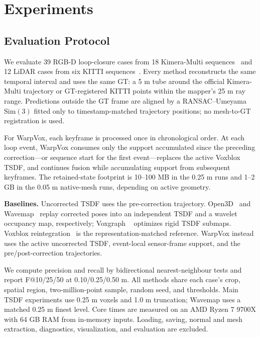 \section{Experiments}
\label{sec:experiments}

\subsection{Evaluation Protocol}

We evaluate 39 RGB-D loop-closure cases from 18 Kimera-Multi
sequences~\cite{tian23arxiv_kimeramultiexperiments} and 12 LiDAR cases from
six KITTI sequences~\cite{Geiger2013IJRR}. Every method reconstructs the same
temporal interval and uses the same GT: a 5 m tube around the official
Kimera-Multi trajectory or GT-registered KITTI points within the mapper's 25 m
ray range. Predictions outside the GT frame are aligned by a RANSAC--Umeyama
$\mathrm{Sim}(3)$ fitted only to timestamp-matched trajectory positions; no
mesh-to-GT registration is used.

For WarpVox, each keyframe is processed once in chronological order. At each
loop event, WarpVox consumes only the support accumulated since the preceding
correction---or sequence start for the first event---replaces the active
Voxblox TSDF, and continues fusion while accumulating support from subsequent
keyframes. The retained-state footprint is 10--100 MB in the 0.25 m runs and
1--2 GB in the 0.05 m native-mesh runs, depending on active geometry.

\noindent\textbf{Baselines.}
Uncorrected TSDF uses the pre-correction trajectory. Open3D~\cite{zhou2018open3dmodernlibrary3d}
and Wavemap~\cite{reijgwart2023wavemap} replay corrected poses into an
independent TSDF and a wavelet occupancy map, respectively; Voxgraph
~\cite{reijgwart2020voxgraph} optimizes rigid TSDF submaps. Voxblox
reintegration~\cite{Oleynikova_2017} is the representation-matched reference.
WarpVox instead uses the active uncorrected TSDF, event-local sensor-frame
support, and the pre/post-correction trajectories.

We compute precision and recall by bidirectional nearest-neighbour tests and
report F@10/25/50 at 0.10/0.25/0.50 m. All methods share each case's crop,
spatial region, two-million-point sample, random seed, and thresholds. Main
TSDF experiments use 0.25 m voxels and 1.0 m truncation; Wavemap uses a matched
0.25 m finest level. Core times are measured on an AMD Ryzen 7 9700X with 64 GB
RAM from in-memory inputs. Loading, saving, normal and mesh extraction,
diagnostics, visualization, and evaluation are excluded.

